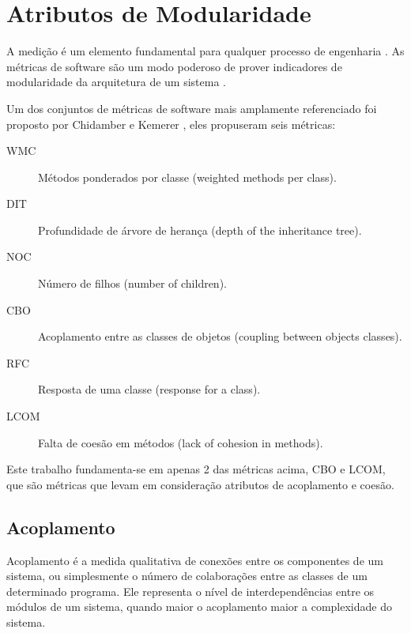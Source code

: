 \section{Atributos de Modularidade}

A medição é um elemento fundamental para qualquer processo de engenharia
\cite{engenhariaDeSoftwarePressman}. As métricas de software são um modo
poderoso de prover indicadores de modularidade da arquitetura de um sistema
\cite{OntheModular}.

Um dos conjuntos de métricas de software mais amplamente referenciado foi
proposto por Chidamber e Kemerer \cite{engenhariaDeSoftwarePressman}, eles
propuseram seis métricas:

\begin{description}
\item[WMC] Métodos ponderados por classe (weighted methods per class).
\item[DIT] Profundidade de árvore de herança (depth of the inheritance tree).
\item[NOC] Número de filhos (number of children).
\item[CBO] Acoplamento entre as classes de objetos (coupling between objects classes).
\item[RFC] Resposta de uma classe (response for a class).
\item[LCOM] Falta de coesão em métodos (lack of cohesion in methods).
\end{description}

Este trabalho fundamenta-se em apenas 2 das métricas acima, CBO e LCOM, que são
métricas que levam em consideração atributos de acoplamento e coesão.

\subsection{Acoplamento}

Acoplamento é a medida qualitativa de conexões entre os componentes de um
sistema, ou simplesmente o número de colaborações entre as classes de um
determinado programa. Ele representa o nível de interdependências entre os
módulos de um sistema, quando maior o acoplamento maior a complexidade do
sistema.


